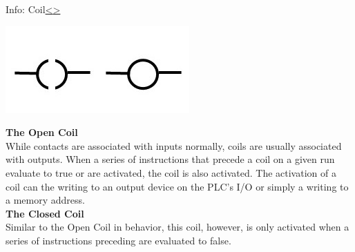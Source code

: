 \documentclass[12pt]{extarticle}
\newenvironment{instructionblock}{\Large\bgroup}{\egroup}
\newcounter{next}
\newcounter{prev}
\begin{document}
\pagebreak
{}
\begin{slide}{Info: Coil}{\hyperref[slide \theprev]{\textless}\hyperref[slide \thenext]{\textgreater}}
\begin{instructionblock}
	\begin{center}
		\includegraphics[scale=2.2]{figures/LadderDiagram03.JPG}
	\end{center}
\end{instructionblock}
\end{slide}
\vfill
\noindent
\textbf{The Open Coil}\\
While contacts are associated with inputs normally, coils are usually associated with outputs. When a series of instructions that precede a coil on a given run evaluate to true or are activated, the coil is also activated. The activation of a coil can the writing to an output device on the PLC's I/O or simply a writing to a memory address. \cite{OP_plcs}\\
\textbf{The Closed Coil}\\
Similar to the Open Coil in behavior, this coil, however, is only activated when a series of instructions preceding are evaluated to false. \cite{OP_plcs} \\

\end{document}
